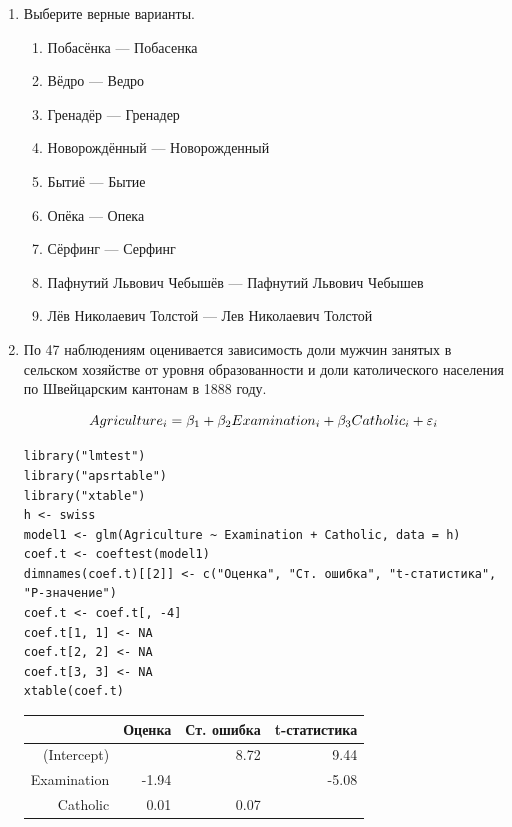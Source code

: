 \documentclass[12pt, a4paper]{article}
\begin{document}
\begin{enumerate}
\item Выберите верные варианты.

\begin{enumerate}
\item Побасёнка — Побасенка
\item Вёдро — Ведро
\item Гренадёр — Гренадер
\item Новорождённый — Новорожденный
\item Бытиё — Бытие
\item Опёка — Опека
\item Сёрфинг — Серфинг
\item Пафнутий Львович Чебышёв — Пафнутий Львович Чебышев
\item Лёв Николаевич Толстой — Лев Николаевич Толстой
\end{enumerate}


\item По 47 наблюдениям оценивается зависимость доли мужчин занятых в сельском хозяйстве от уровня образованности и доли католического населения по Швейцарским кантонам в 1888 году.

\[Agriculture_i=\beta_1+\beta_2 Examination_i+\beta_3 Catholic_i+\varepsilon_i\]

\begin{verbatim}
library("lmtest")
library("apsrtable")
library("xtable")
h <- swiss
model1 <- glm(Agriculture ~ Examination + Catholic, data = h)
coef.t <- coeftest(model1)
dimnames(coef.t)[[2]] <- c("Оценка", "Ст. ошибка", "t-статистика", "P-значение")
coef.t <- coef.t[, -4]
coef.t[1, 1] <- NA
coef.t[2, 2] <- NA
coef.t[3, 3] <- NA
xtable(coef.t)
\end{verbatim}

\begin{table}[ht]
\centering
\begin{tabular}{rrrr}
  \hline
 & Оценка & Ст. ошибка & t-статистика \\
  \hline
(Intercept) &  & 8.72 & 9.44 \\
  Examination & -1.94 &  & -5.08 \\
  Catholic & 0.01 & 0.07 &  \\
   \hline
\end{tabular}
\end{table}





\end{enumerate}
\end{document}
